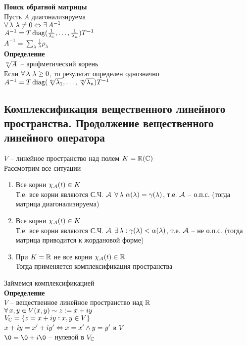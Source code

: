 \documentclass[12pt]{article}
\begin{document}
\textbf{Поиск обратной матрицы}\\
Пусть $A$ диагонализируема\\
$\forall\, \lambda\ \lambda \neq 0 \Leftrightarrow \exists\, A^{-1}$\\
$A^{-1} = T\operatorname{diag}(\frac1{\lambda_1}, \ldots, \frac1{\lambda_n})T^{-1}$\\
$A^{-1} = \sum_\lambda \frac1\lambda \rho_\lambda$\\
\textbf{Определение}\\
$\sqrt[m]A$ -- арифметический корень\\
Если $\forall\, \lambda\ \lambda \geq 0$, то результат определен однозначно\\
$A^{-1} = T\operatorname{diag}(\sqrt[m]{\lambda_1}, \ldots, \sqrt[m]{\lambda_n})T^{-1}$\\
\subsection{Комплексификация вещественного линейного пространства. Продолжение вещественного линейного оператора}
$V$ -- линейное пространство над полем $K = \mathbb{R} (\mathbb{C})$\\
Рассмотрим все ситуации
\begin{enumerate}
    \item Все корни $\chi_\mathcal{A}(t) \in K$\\
    Т.е. все корни являются С.Ч. $\mathcal{A}$
    $\forall\, \lambda\ \alpha(\lambda) = \gamma(\lambda)$, т.е. $\mathcal{A}$ -- о.п.с. (тогда матрица диагонализируема)
    \item Все корни $\chi_\mathcal{A}(t) \in K$\\
    Т.е. все корни являются С.Ч. $\mathcal{A}$
    $\exists\, \lambda: \gamma(\lambda) < \alpha(\lambda)$, т.е. $\mathcal{A}$ -- не о.п.с. (тогда матрица приводится к жордановой форме)
    \item При $K = \mathbb{R}$ не все корни $\chi_\mathcal{A}(t) \in \mathbb{R}$\\
    Тогда применяется комплексификация пространства
\end{enumerate}
Займемся комплексификацией\\
\textbf{Определение}\\
$V$ -- вещественное линейное пространство над $\mathbb{R}$\\
$\forall\, x,y \in V (x,y) \sim z:= x+iy$\\
$V_\mathbb{C} = \{ z = x+iy: x,y \in V \}$\\
$x+iy = x'+iy' \Leftrightarrow x=x' \land y=y'$ в $V$\\
$\0 = \0 + i\0$ -- нулевой в $V_\mathbb{C}$\\
\end{document}
